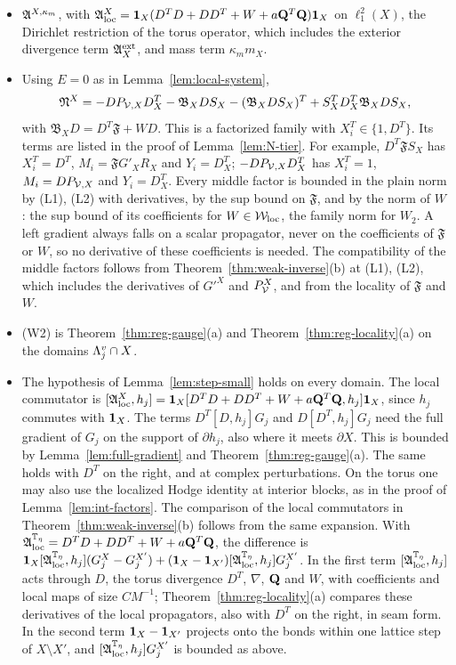 \begin{enumerate}[label=(L\arabic*)]
  \begin{itemize}
  \item $\mathfrak A^{X,\kappa_m}$, with $\mathfrak A^X_{\rm loc}=\mathbf 1_X(D^TD+DD^T+W+a\mathbf Q^T\mathbf Q)\mathbf 1_X$ on $\ell^2_1(X)$, the Dirichlet restriction of the torus operator, which includes the exterior divergence term $\mathfrak A^{\rm ext}_X$, and mass term $\kappa_mm_X$.
  \item Using $E=0$ as in Lemma~\ref{lem:local-system},
  \[
  \mathfrak N^X=-DP_{\mathcal V,X}D^T_X-\mathfrak B_XDS_X-(\mathfrak B_XDS_X)^T+S_X^TD^T_X\mathfrak B_XDS_X ,
  \]
  with $\mathfrak B_XD=D^T\mathfrak F+WD$.
  This is a factorized family with $X_i^T\in\{1,D^T\}$. Its terms are listed in the proof of Lemma~\ref{lem:N-tier}. For example, $D^T\mathfrak FS_X$ has $X_i^T=D^T$, $M_i=\mathfrak FG'_XR_X$ and $Y_i=D^T_X$; $-DP_{\mathcal V,X}D^T_X$ has $X_i^T=1$, $M_i=DP_{\mathcal V,X}$ and $Y_i=D^T_X$. Every middle factor is bounded in the plain norm by (L1), (L2) with derivatives, by the sup bound on $\mathfrak F$, and by the norm of $W$: the sup bound of its coefficients for $W\in\mathcal W_{\rm loc}$, the family norm for $W_2$. A left gradient always falls on a scalar propagator, never on the coefficients of $\mathfrak F$ or $W$, so no derivative of these coefficients is needed. The compatibility of the middle factors follows from Theorem~\ref{thm:weak-inverse}(b) at (L1), (L2), which includes the derivatives of $G'^X$ and $P^X_\mathcal V$, and from the locality of $\mathfrak F$ and $W$.
  \item (W2) is Theorem~\ref{thm:reg-gauge}(a) and Theorem~\ref{thm:reg-locality}(a) on the domains $\Lambda^v_j\cap X$.
  \item The hypothesis of Lemma~\ref{lem:step-small} holds on every domain. The local commutator is $[\mathfrak A^X_{\rm loc},h_j]=\mathbf 1_X[D^TD+DD^T+W+a\mathbf Q^T\mathbf Q,h_j]\mathbf 1_X$, since $h_j$ commutes with $\mathbf 1_X$. The terms $D^T[D,h_j]G_j$ and $D[D^T,h_j]G_j$ need the full gradient of $G_j$ on the support of $\partial h_j$, also where it meets $\partial X$. This is bounded by Lemma~\ref{lem:full-gradient} and Theorem~\ref{thm:reg-gauge}(a). The same holds with $D^T$ on the right, and at complex perturbations. On the torus one may also use the localized Hodge identity at interior blocks, as in the proof of Lemma~\ref{lem:int-factors}. The comparison of the local commutators in Theorem~\ref{thm:weak-inverse}(b) follows from the same expansion. With $\mathfrak A^{\mathbb T_\eta}_{\rm loc}=D^TD+DD^T+W+a\mathbf Q^T\mathbf Q$, the difference is $\mathbf 1_X[\mathfrak A^{\mathbb T_\eta}_{\rm loc},h_j](G^X_j-G^{X'}_j)+(\mathbf 1_X-\mathbf 1_{X'})[\mathfrak A^{\mathbb T_\eta}_{\rm loc},h_j]G^{X'}_j$. In the first term $[\mathfrak A^{\mathbb T_\eta}_{\rm loc},h_j]$ acts through $D$, the torus divergence $D^T$, $\nabla$, $\mathbf Q$ and $W$, with coefficients and local maps of size $CM^{-1}$; Theorem~\ref{thm:reg-locality}(a) compares these derivatives of the local propagators, also with $D^T$ on the right, in seam form. In the second term $\mathbf 1_X-\mathbf 1_{X'}$ projects onto the bonds within one lattice step of $X\setminus X'$, and $[\mathfrak A^{\mathbb T_\eta}_{\rm loc},h_j]G^{X'}_j$ is bounded as above.

\end{itemize}
\end{enumerate}
